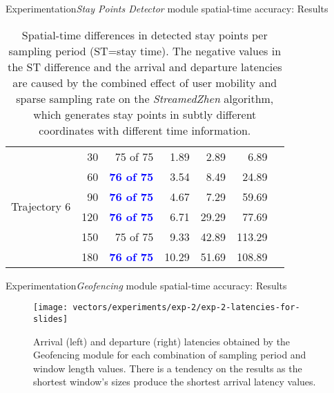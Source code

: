 \begin{frame}{Experimentation}{\emph{Stay Points Detector} module spatial-time accuracy: Results}
\begin{table}
{\begin{tabular}{@{}lrrrrrr@{}}
\multirow{6}{*}{Trajectory 6} 
 & 30 & 75 of 75 & 1.89 & 2.89 & 6.89 \\
 & 60 & \textcolor{blue}{\textbf{76 of 75}} & 3.54 & 8.49 & 24.89 \\
 & 90 & \textcolor{blue}{\textbf{76 of 75}} & 4.67  & 7.29 & 59.69 \\
 & 120 & \textcolor{blue}{\textbf{76 of 75}} & 6.71 & 29.29 & 77.69 \\
 & 150 & 75 of 75 & 9.33 & 42.89 & 113.29 \\
 & 180 & \textcolor{blue}{\textbf{76 of 75}} & 10.29 & 51.69 & 108.89 \\
 \bottomrule 
\end{tabular}
}
\caption{Spatial-time differences in detected stay points per sampling period (ST=stay time). The negative values in the ST difference and the arrival and departure latencies are caused by the combined effect of user mobility and sparse sampling rate on the \emph{StreamedZhen} algorithm, which generates stay points in subtly different coordinates with different time information.}
\end{table}
\end{frame}



\begin{frame}{Experimentation}{\emph{Geofencing} module spatial-time accuracy: Results}
\vspace{-0.5cm}
\begin{figure}
  \centering
  \texttt{[image: vectors/experiments/exp-2/exp-2-latencies-for-slides]}
  \caption{Arrival (left) and departure (right) latencies obtained by the Geofencing  module for each combination of sampling period and window length values. There is a tendency on the results as the shortest window’s sizes produce the shortest arrival latency values.}
\end{figure}
\end{frame}


